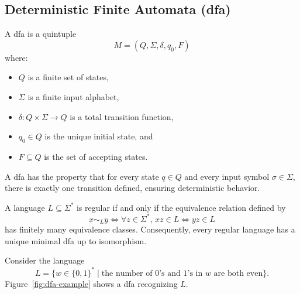 
\subsection{Deterministic Finite Automata (\gls{dfa})}
\label{subsec:dfa}

\begin{definition}
A \gls{dfa} is a quintuple 
\[
M = (Q, \Sigma, \delta, q_0, F)
\]
where:
\begin{itemize}
    \item \( Q \) is a finite set of states,
    \item \( \Sigma \) is a finite input alphabet,
    \item \( \delta: Q \times \Sigma \rightarrow Q \) is a total transition function,
    \item \( q_0 \in Q \) is the unique initial state, and
    \item \( F \subseteq Q \) is the set of accepting states.
\end{itemize}
\end{definition}

\begin{remark}
A \gls{dfa} has the property that for every state \( q \in Q \) and every input symbol \( \sigma \in \Sigma \), there is exactly one transition defined, ensuring deterministic behavior.
\end{remark}

\begin{theorem}
\label{thm:myhill-nerode}
A language \( L \subseteq \Sigma^* \) is regular if and only if the equivalence relation defined by 
\[
x \sim_L y \iff \forall z \in \Sigma^*,\, xz \in L \Longleftrightarrow yz \in L
\]
has finitely many equivalence classes. Consequently, every regular language has a unique minimal \gls{dfa} up to isomorphism.
\end{theorem}

\begin{example}
Consider the language 
\[
L = \{ w \in \{0,1\}^* \mid \text{the number of \(0\)'s and \(1\)'s in \(w\) are both even} \}.
\]
Figure~\ref{fig:dfa-example} shows a \gls{dfa} recognizing \( L \).
\end{example}

